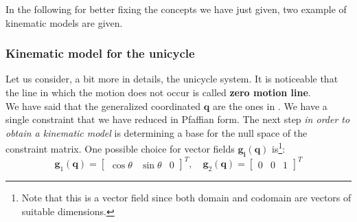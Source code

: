 In the following for better fixing the concepts we have just given, two example of kinematic models are given.

\subsubsection{Kinematic model for the unicycle}
Let us consider, a bit more in details, the unicycle system. It is noticeable that the line in which the motion does not occur is called \textbf{zero motion line}.\\
We have said that the generalized coordinated $\mathbf{q}$ are the ones in . We have a single constraint that we have reduced in Pfaffian form. The next step \emph{in order to obtain a kinematic model} is determining a base for the null space of the constraint matrix. One possible choice for vector fields $\mathbf{g_i(q)}$ is\footnote{
    Note that this is a vector field since both domain and codomain are vectors of suitable dimensions.
}:
\begin{equation*}
    \mathbf{g}_1(\mathbf{q})=\begin{bmatrix}
        \cos\theta&\sin\theta&0
    \end{bmatrix}^T, \quad
    \mathbf{g}_2(\mathbf{q})=\begin{bmatrix}
        0&0&1
    \end{bmatrix}^T
\end{equation*}
